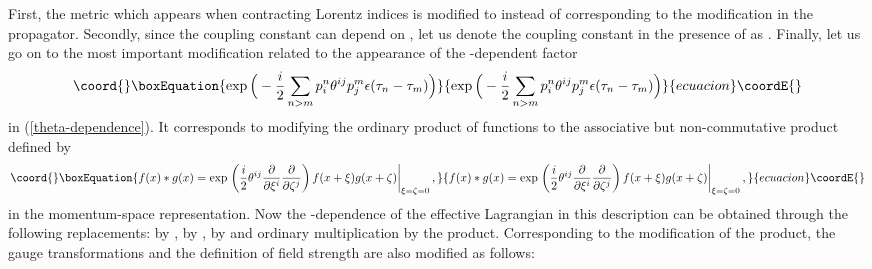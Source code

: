\documentclass[a4paper,12pt]{article}
\begin{document}
First, the metric which appears when contracting
Lorentz indices is modified to \coordHE{} instead of \coordHE{}
corresponding to the modification in the propagator.
Secondly, since the coupling constant can depend
on \coordHE{}, let us denote the coupling constant
in the presence of \coordHE{} as \coordHE{}.
Finally, let us go on to the most important modification
related to the appearance of the \myHighlight{$\theta$}\coordHE{}-dependent factor
\begin{equation}\coord{}\boxEquation{
\exp \Big(
-\frac{i}{2} \sum_{n > m} p^n_i \theta^{ij} p^m_j
\epsilon (\tau_n - \tau_m)
\Big)
}{
\exp \Big(
-\frac{i}{2} \sum_{n > m} p^n_i \theta^{ij} p^m_j
\epsilon (\tau_n - \tau_m)
\Big)
}{ecuacion}\coordE{}\end{equation}
in (\ref{theta-dependence}).
It corresponds to modifying the ordinary product of functions
to the associative but non-commutative \myHighlight{$\ast$}\coordHE{} product defined by
\begin{equation}\coord{}\boxEquation{
f(x) \ast g(x) = \exp \left. \left(
\frac{i}{2} \theta^{ij}
\frac{\partial}{\partial \xi^i}
\frac{\partial}{\partial \zeta^j} \right)
f(x + \xi) g(x + \zeta) \right|_{\xi=\zeta=0},
}{
f(x) \ast g(x) = \exp \left. \left(
\frac{i}{2} \theta^{ij}
\frac{\partial}{\partial \xi^i}
\frac{\partial}{\partial \zeta^j} \right)
f(x + \xi) g(x + \zeta) \right|_{\xi=\zeta=0},
}{ecuacion}\coordE{}\end{equation}
in the momentum-space representation.
Now the \coordHE{}-dependence of the effective Lagrangian
in this description can be obtained
through the following replacements:
\coordHE{} by \coordHE{}, \coordHE{} by \coordHE{}, \coordHE{} by \coordHE{}
and ordinary multiplication by the \myHighlight{$\ast$}\coordHE{} product.
Corresponding to the modification of the product,
the gauge transformations and the definition of field strength
are also modified as follows:
\end{document}
